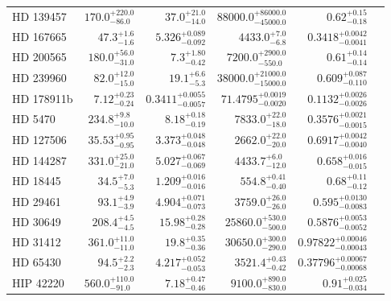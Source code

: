 \begin{longtable*}{lrrrrr}
HD 139457 & $170.0^{+220.0}_{-86.0}$ & $37.0^{+21.0}_{-14.0}$ & $88000.0^{+86000.0}_{-45000.0}$ & $0.62^{+0.15}_{-0.18}$ \\ 
HD 167665 & $47.3^{+1.6}_{-1.6}$ & $5.326^{+0.089}_{-0.092}$ & $4433.0^{+7.0}_{-6.8}$ & $0.3418^{+0.0042}_{-0.0041}$ \\ 
HD 200565 & $180.0^{+56.0}_{-31.0}$ & $7.3^{+1.80}_{-0.42}$ & $7200.0^{+2900.0}_{-550.0}$ & $0.61^{+0.14}_{-0.14}$ \\ 
HD 239960 & $82.0^{+12.0}_{-15.0}$ & $19.1^{+6.6}_{-5.3}$ & $38000.0^{+21000.0}_{-15000.0}$ & $0.609^{+0.087}_{-0.110}$ \\ 
HD 178911b & $7.12^{+0.23}_{-0.24}$ & $0.3411^{+0.0055}_{-0.0057}$ & $71.4795^{+0.0019}_{-0.0020}$ & $0.1132^{+0.0026}_{-0.0026}$ \\ 
HD 5470 & $234.8^{+9.8}_{-10.0}$ & $8.18^{+0.18}_{-0.19}$ & $7833.0^{+22.0}_{-18.0}$ & $0.3576^{+0.0021}_{-0.0015}$ \\ 
HD 127506 & $35.53^{+0.95}_{-0.95}$ & $3.373^{+0.048}_{-0.048}$ & $2662.0^{+22.0}_{-20.0}$ & $0.6917^{+0.0042}_{-0.0040}$ \\ 
HD 144287 & $331.0^{+25.0}_{-21.0}$ & $5.027^{+0.067}_{-0.069}$ & $4433.7^{+6.0}_{-12.0}$ & $0.658^{+0.016}_{-0.015}$ \\ 
HD 18445 & $34.5^{+7.0}_{-5.3}$ & $1.209^{+0.016}_{-0.016}$ & $554.8^{+0.41}_{-0.40}$ & $0.68^{+0.11}_{-0.12}$ \\ 
HD 29461 & $93.1^{+4.9}_{-3.9}$ & $4.904^{+0.071}_{-0.073}$ & $3759.0^{+26.0}_{-26.0}$ & $0.595^{+0.0130}_{-0.0083}$ \\ 
HD 30649 & $208.4^{+4.5}_{-4.5}$ & $15.98^{+0.28}_{-0.28}$ & $25860.0^{+530.0}_{-500.0}$ & $0.5876^{+0.0053}_{-0.0052}$ \\ 
HD 31412 & $361.0^{+11.0}_{-11.0}$ & $19.8^{+0.35}_{-0.36}$ & $30650.0^{+300.0}_{-290.0}$ & $0.97822^{+0.00046}_{-0.00043}$ \\ 
HD 65430 & $94.5^{+2.2}_{-2.3}$ & $4.217^{+0.052}_{-0.053}$ & $3521.4^{+0.43}_{-0.42}$ & $0.37796^{+0.00067}_{-0.00068}$ \\ 
HIP 42220 & $560.0^{+110.0}_{-91.0}$ & $7.18^{+0.47}_{-0.46}$ & $9100.0^{+890.0}_{-830.0}$ & $0.91^{+0.025}_{-0.034}$ \\ 
\bottomrule 
\end{longtable*} 
